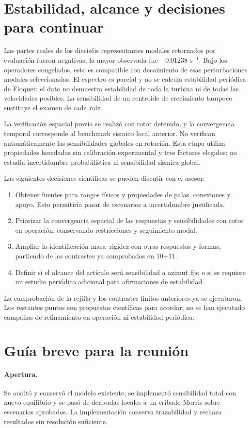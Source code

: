 \documentclass[11pt,a4paper]{article}
\begin{document}
\section{Estabilidad, alcance y decisiones para continuar}
Las partes reales de los dieciséis representantes modales retornados por evaluación fueron negativas; la mayor observada fue $-0.01238$ s$^{-1}$. Bajo los operadores congelados, esto es compatible con decaimiento de esas perturbaciones modales seleccionadas. El espectro es parcial y no se calcula estabilidad periódica de Floquet: el dato no demuestra estabilidad de toda la turbina ni de todas las velocidades posibles. La sensibilidad de un centroide de crecimiento tampoco sustituye el examen de cada raíz.

La verificación espacial previa se realizó con rotor detenido, y la convergencia temporal corresponde al benchmark sísmico local anterior. No verifican automáticamente las sensibilidades globales en rotación. Esta etapa utiliza propiedades heredadas sin calibración experimental y tres factores elegidos; no estudia incertidumbre probabilística ni sensibilidad sísmica global.

Las siguientes decisiones científicas se pueden discutir con el asesor:
\begin{enumerate}
\item Obtener fuentes para rangos físicos y propiedades de palas, conexiones y apoyo. Esto permitiría pasar de escenarios a incertidumbre justificada.
\item Priorizar la convergencia espacial de las respuestas y sensibilidades con rotor en operación, conservando restricciones y seguimiento modal.
\item Ampliar la identificación masa--rigidez con otras respuestas y formas, partiendo de los contrastes ya comprobados en 10+11.
\item Definir si el alcance del artículo será sensibilidad a azimut fijo o si se requiere un estudio periódico adicional para afirmaciones de estabilidad.
\end{enumerate}
La comprobación de la rejilla y los contrastes finitos anteriores ya se ejecutaron. Los restantes puntos son propuestas científicas para acordar; no se han ejecutado campañas de refinamiento en operación ni estabilidad periódica.

\section{Guía breve para la reunión}
\paragraph{Apertura.} Se auditó y conservó el modelo existente, se implementó sensibilidad total con nuevo equilibrio y se pasó de derivadas locales a un cribado Morris sobre escenarios aprobados. La implementación conserva trazabilidad y rechaza resultados sin resolución suficiente.
\end{document}
